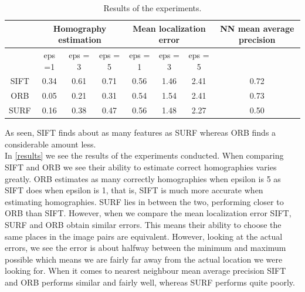 \begin{table}[h]
	\centering
	\begin{tabular}{|c||ccc||ccc||c|}
		\hline
		& \multicolumn{3}{c||}{Homography estimation}                           & \multicolumn{3}{c||}{Mean localization error}                          & NN mean average precision \\ \hline
		& \multicolumn{1}{c|}{eps =1} & \multicolumn{1}{c|}{eps = 3} & eps = 5 & \multicolumn{1}{c|}{eps = 1} & \multicolumn{1}{c|}{eps = 3} & eps = 5 &                           \\ \hline
		SIFT & \multicolumn{1}{c|}{0.34}   & \multicolumn{1}{c|}{0.61}    & 0.71    & \multicolumn{1}{c|}{0.56}    & \multicolumn{1}{c|}{1.46}    & 2.41    & 0.72                      \\ \hline
		ORB  & \multicolumn{1}{c|}{0.05}   & \multicolumn{1}{c|}{0.21}    & 0.31    & \multicolumn{1}{c|}{0.54}    & \multicolumn{1}{c|}{1.54}    & 2.41    & 0.73                      \\ \hline
		SURF & \multicolumn{1}{c|}{0.16}   & \multicolumn{1}{c|}{0.38}    & 0.47    & \multicolumn{1}{c|}{0.56}    & \multicolumn{1}{c|}{1.48}    & 2.27    & 0.50                      \\ \hline
	\end{tabular}
	\caption{Results of the experiments.}
	\label{results}
\end{table}
As seen, SIFT finds about as many features as SURF whereas ORB finds a considerable amount less.\\
In \autoref{results} we see the results of the experiments conducted. When comparing SIFT and ORB we see their ability to estimate correct homographies varies greatly. ORB estimates as many correctly homographies when epsilon is 5 as SIFT does when epsilon is 1, that is, SIFT is much more accurate when estimating homographies. SURF lies in between the two, performing closer to ORB than SIFT. However, when we compare the mean localization error SIFT, SURF and ORB obtain similar errors. This means their ability to choose the same places in the image pairs are equivalent. However, looking at the actual errors, we see the error is about halfway between the minimum and maximum possible which means we are fairly far away from the actual location we were looking for. When it comes to nearest neighbour mean average precision SIFT and ORB performs similar and fairly well, whereas SURF performs quite poorly.